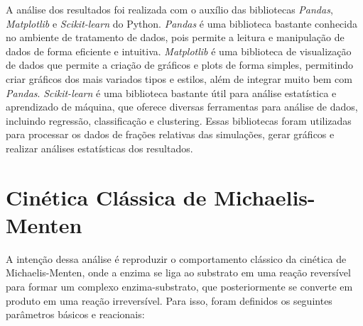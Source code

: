 \documentclass[12pt,oneside]{report}
\begin{document}
A análise dos resultados foi realizada com o auxílio das bibliotecas \textit{Pandas}, \textit{Matplotlib} e \textit{Scikit-learn} do Python. \textit{Pandas} é uma biblioteca bastante conhecida no ambiente de tratamento de dados, pois permite a leitura e manipulação de dados de forma eficiente e intuitiva. \textit{Matplotlib} é uma biblioteca de visualização de dados que permite a criação de gráficos e plots de forma simples, permitindo criar gráficos dos mais variados tipos e estilos, além de integrar muito bem com \textit{Pandas}. \textit{Scikit-learn} é uma biblioteca bastante útil para análise estatística e aprendizado de máquina, que oferece diversas ferramentas para análise de dados, incluindo regressão, classificação e clustering. Essas bibliotecas foram utilizadas para processar os dados de frações relativas das simulações, gerar gráficos e realizar análises estatísticas dos resultados.

\section{Cinética Clássica de Michaelis-Menten}

A intenção dessa análise é reproduzir o comportamento clássico da cinética de Michaelis-Menten, onde a enzima se liga ao substrato em uma reação reversível para formar um complexo enzima-substrato, que posteriormente se converte em produto em uma reação irreversível. Para isso, foram definidos os seguintes parâmetros básicos e reacionais:
\end{document}
